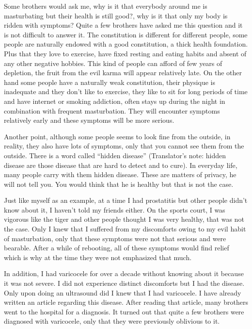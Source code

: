 \documentclass[
]{book}
\begin{document}
Some brothers would ask me, why is it that everybody around me is masturbating but their health is still good?, why is it that only my body is ridden with symptoms? Quite a few brothers have asked me this question and it is not difficult to answer it. The constitution is different for different people, some people are naturally endowed with a good constitution, a thick health foundation. Plus that they love to exercise, have fixed resting and eating habits and absent of any other negative hobbies. This kind of people can afford of few years of depletion, the fruit from the evil karma will appear relatively late. On the other hand some people have a naturally weak constitution, their physique is inadequate and they don't like to exercise, they like to sit for long periods of time and have internet or smoking addiction, often stays up during the night in combination with frequent masturbation. They will encounter symptoms relatively early and these symptoms will be more serious.

Another point, although some people seems to look fine from the outside, in reality, they also have lots of symptoms, only that you cannot see them from the outside. There is a word called ``hidden disease'' (Translator's note: hidden disease are those disease that are hard to detect and to cure). In everyday life, many people carry with them hidden disease. These are matters of privacy, he will not tell you. You would think that he is healthy but that is not the case.

Just like myself as an example, at a time I had prostatitis but other people didn't know about it, I haven't told my friends either. On the sports court, I was vigorous like the tiger and other people thought I was very healthy, that was not the case. Only I knew that I suffered from my discomforts owing to my evil habit of masturbation, only that these symptoms were not that serious and were bearable. After a while of rebooting, all of these symptoms would find relief which is why at the time they were not emphasized that much.

In addition, I had varicocele for over a decade without knowing about it because it was not severe. I did not experience distinct discomforts but I had the disease. Only upon doing an ultrasound did I knew that I had varicocele. I have already written an article regarding this disease. After reading that article, many brothers went to the hospital for a diagnosis. It turned out that quite a few brothers were diagnosed with varicocele, only that they were previously oblivious to it.
\end{document}
